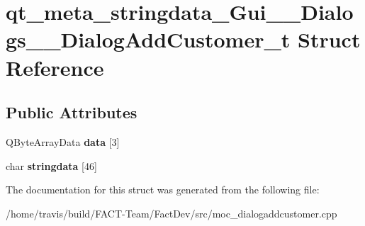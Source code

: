 \hypertarget{structqt__meta__stringdata__Gui____Dialogs____DialogAddCustomer__t}{\section{qt\-\_\-meta\-\_\-stringdata\-\_\-\-Gui\-\_\-\-\_\-\-Dialogs\-\_\-\-\_\-\-Dialog\-Add\-Customer\-\_\-t Struct Reference}
\label{structqt__meta__stringdata__Gui____Dialogs____DialogAddCustomer__t}
}
\subsection*{Public Attributes}
\begin{DoxyCompactItemize}
\item 
\hypertarget{structqt__meta__stringdata__Gui____Dialogs____DialogAddCustomer__t_a1f88e99c5ed67ba3655a4dc72f9c99a7}{Q\-Byte\-Array\-Data {\bfseries data} \mbox{[}3\mbox{]}}\label{structqt__meta__stringdata__Gui____Dialogs____DialogAddCustomer__t_a1f88e99c5ed67ba3655a4dc72f9c99a7}

\item 
\hypertarget{structqt__meta__stringdata__Gui____Dialogs____DialogAddCustomer__t_a18fcbdb2169a641bdeb28b5bcabecfd1}{char {\bfseries stringdata} \mbox{[}46\mbox{]}}\label{structqt__meta__stringdata__Gui____Dialogs____DialogAddCustomer__t_a18fcbdb2169a641bdeb28b5bcabecfd1}

\end{DoxyCompactItemize}


The documentation for this struct was generated from the following file\-:\begin{DoxyCompactItemize}
\item 
/home/travis/build/\-F\-A\-C\-T-\/\-Team/\-Fact\-Dev/src/moc\-\_\-dialogaddcustomer.\-cpp\end{DoxyCompactItemize}
